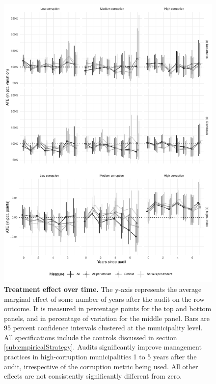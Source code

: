 \begin{figure}[H]
    \centering
    \includegraphics{chapters/chapter_2/figures/AMEoverTime}
    \caption{{\bf Treatment effect over time.} The y-axis represents the average marginal effect of some number of years after the audit on the row outcome. It is measured in percentage points for the top and bottom panels, and in percentage of variation for the middle panel. Bars are 95 percent confidence intervals clustered at the municipality level. All specifications include the controls discussed in section \ref{sub:empiricalStrategy}. Audits significantly improve management practices in high-corruption municipalities 1 to 5 years after the audit, irrespective of the corruption metric being used. All other effects are not consistently significantly different from zero.}
    \label{fig:AMEoverTime}
\end{figure}


